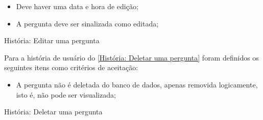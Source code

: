 \begin{itemize}
\item Deve haver uma data e hora de edição;
\item A pergunta deve ser sinalizada como editada;
\end{itemize}

\def\arraystretch{2}
\begin{quadro}[htb]
\centering
\ABNTEXfontereduzida
\caption[História: Editar uma pergunta]{História: Editar uma pergunta}
\label{História: Editar uma pergunta}
\end{quadro}
\FloatBarrier 

Para a história de usuário do \autoref{História: Deletar uma pergunta} foram definidos os seguintes itens como critérios de aceitação:

\begin{itemize}
\item A pergunta não é deletada do banco de dados, apenas removida logicamente, isto é, não pode ser visualizada;
\end{itemize}

\def\arraystretch{2}
\begin{quadro}[htb]
\centering
\ABNTEXfontereduzida
\caption[História: Deletar uma pergunta]{História: Deletar uma pergunta}
\label{História: Deletar uma pergunta}
\end{quadro}
\FloatBarrier 

